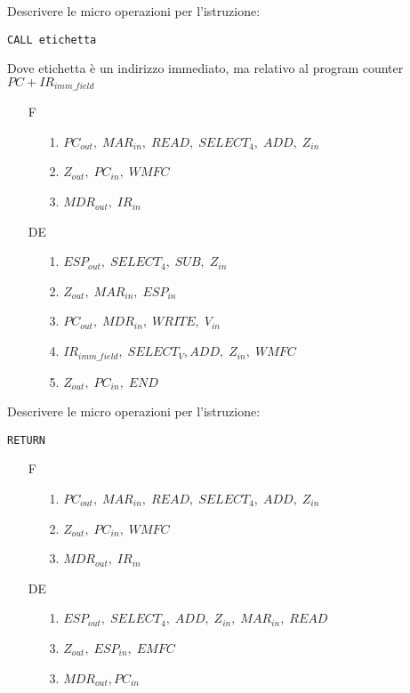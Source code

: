 \documentclass[a4paper]{article}
\theoremstyle{break}
\theoremstyle{break}
\theoremstyle{break}
\theoremstyle{break}
\begin{document}
\begin{exercise}
	Descrivere le micro operazioni per l'istruzione:
	\begin{center}
		\texttt{CALL etichetta}
	\end{center}
	Dove etichetta è un indirizzo immediato, ma relativo al program counter
	\( PC + IR_{imm\_field} \)

	\begin{enumerate}
		\item[F]
		      \begin{enumerate}
			      \item[1.] \( PC_{out},\; MAR_{in},\; READ ,\; SELECT_4,\; ADD,\; Z_{in}\)
			      \item[2.] \( Z_{out},\; PC_{in},\;WMFC \)
			      \item[3.] \( MDR_{out},\; IR_{in} \)
		      \end{enumerate}

		\item [DE]
		      \begin{enumerate}
			      \item[1.] \( ESP_{out} ,\; SELECT_4 ,\; SUB,\; Z_{in} \)
			      \item[2.] \( Z_{out},\; MAR_{in} ,\; ESP_{in} \)
			      \item[3.] \( PC_{out} ,\; MDR_{in} ,\; WRITE ,\; V_{in}\)
			      \item[4.] \( IR_{imm\_field} ,\; SELECT_V, ADD ,\; Z_{in} ,\; WMFC \)
			      \item[5.] \( Z_{out} ,\; PC_{in} ,\; END\)
		      \end{enumerate}
	\end{enumerate}
\end{exercise}

\begin{exercise}
	Descrivere le micro operazioni per l'istruzione:
	\begin{center}
		\texttt{RETURN}
	\end{center}
	\begin{enumerate}
		\item[F]
		      \begin{enumerate}
			      \item[1.] \( PC_{out},\; MAR_{in},\; READ ,\; SELECT_4,\; ADD,\; Z_{in}\)
			      \item[2.] \( Z_{out},\; PC_{in},\;WMFC \)
			      \item[3.] \( MDR_{out},\; IR_{in} \)
		      \end{enumerate}

		\item [DE]
		      \begin{enumerate}
			      \item[1.] \( ESP_{out} ,\; SELECT_4 ,\; ADD,\; Z_{in},\; MAR_{in},\; READ \)
			      \item[3.] \( Z_{out},\; ESP_{in},\; EMFC \)
			      \item[3.] \( MDR_{out}, PC_{in} \)
		      \end{enumerate}
	\end{enumerate}
\end{exercise}
\end{document}
